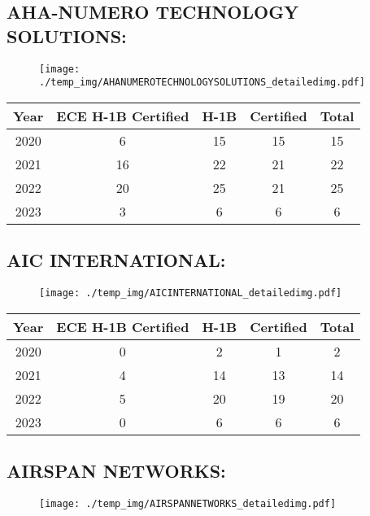 \documentclass{article}%
\begin{document}
%
\newpage%
\subsection{AHA{-}NUMERO TECHNOLOGY SOLUTIONS:}%
\label{subsec:AHA{-}NUMEROTECHNOLOGYSOLUTIONS}%
\label{AHANUMEROTECHNOLOGYSOLUTIONSdetailed}%


\begin{figure}[htbp]%
\centering%
\texttt{[image: ./temp\_img/AHANUMEROTECHNOLOGYSOLUTIONS\_detailedimg.pdf]}%
\end{figure}

%
\begin{longtable}{c|c|c|c|c}%
\hline%
Year&ECE H{-}1B Certified&H{-}1B&Certified&Total\\%
\hline%
2020&6&15&15&15\\%
\hline%
2021&16&22&21&22\\%
\hline%
2022&20&25&21&25\\%
\hline%
2023&3&6&6&6\\%
\hline%
\end{longtable}

%
\newpage%
\subsection{AIC INTERNATIONAL:}%
\label{subsec:AICINTERNATIONAL}%
\label{AICINTERNATIONALdetailed}%


\begin{figure}[htbp]%
\centering%
\texttt{[image: ./temp\_img/AICINTERNATIONAL\_detailedimg.pdf]}%
\end{figure}

%
\begin{longtable}{c|c|c|c|c}%
\hline%
Year&ECE H{-}1B Certified&H{-}1B&Certified&Total\\%
\hline%
2020&0&2&1&2\\%
\hline%
2021&4&14&13&14\\%
\hline%
2022&5&20&19&20\\%
\hline%
2023&0&6&6&6\\%
\hline%
\end{longtable}

%
\newpage%
\subsection{AIRSPAN NETWORKS:}%
\label{subsec:AIRSPANNETWORKS}%
\label{AIRSPANNETWORKSdetailed}%


\begin{figure}[htbp]%
\centering%
\texttt{[image: ./temp\_img/AIRSPANNETWORKS\_detailedimg.pdf]}%
\end{figure}
\end{document}
